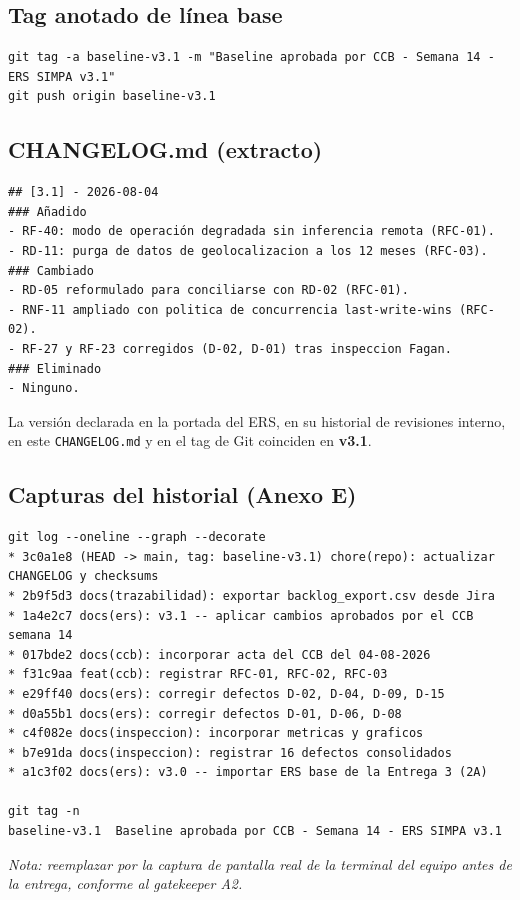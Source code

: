 \documentclass[11pt,a4paper]{article}
\begin{document}
\subsection{Tag anotado de línea base}

\begin{verbatim}
git tag -a baseline-v3.1 -m "Baseline aprobada por CCB - Semana 14 - ERS SIMPA v3.1"
git push origin baseline-v3.1
\end{verbatim}

\subsection{CHANGELOG.md (extracto)}

\begin{verbatim}
## [3.1] - 2026-08-04
### Añadido
- RF-40: modo de operación degradada sin inferencia remota (RFC-01).
- RD-11: purga de datos de geolocalizacion a los 12 meses (RFC-03).
### Cambiado
- RD-05 reformulado para conciliarse con RD-02 (RFC-01).
- RNF-11 ampliado con politica de concurrencia last-write-wins (RFC-02).
- RF-27 y RF-23 corregidos (D-02, D-01) tras inspeccion Fagan.
### Eliminado
- Ninguno.
\end{verbatim}

\noindent La versión declarada en la portada del ERS, en su historial de revisiones interno, en
este \texttt{CHANGELOG.md} y en el tag de Git coinciden en \textbf{v3.1}.

\subsection{Capturas del historial (Anexo E)}

\begin{verbatim}
git log --oneline --graph --decorate
* 3c0a1e8 (HEAD -> main, tag: baseline-v3.1) chore(repo): actualizar CHANGELOG y checksums
* 2b9f5d3 docs(trazabilidad): exportar backlog_export.csv desde Jira
* 1a4e2c7 docs(ers): v3.1 -- aplicar cambios aprobados por el CCB semana 14
* 017bde2 docs(ccb): incorporar acta del CCB del 04-08-2026
* f31c9aa feat(ccb): registrar RFC-01, RFC-02, RFC-03
* e29ff40 docs(ers): corregir defectos D-02, D-04, D-09, D-15
* d0a55b1 docs(ers): corregir defectos D-01, D-06, D-08
* c4f082e docs(inspeccion): incorporar metricas y graficos
* b7e91da docs(inspeccion): registrar 16 defectos consolidados
* a1c3f02 docs(ers): v3.0 -- importar ERS base de la Entrega 3 (2A)

git tag -n
baseline-v3.1  Baseline aprobada por CCB - Semana 14 - ERS SIMPA v3.1
\end{verbatim}
\emph{Nota: reemplazar por la captura de pantalla real de la terminal del equipo antes de la
entrega, conforme al gatekeeper A2.}
\end{document}
